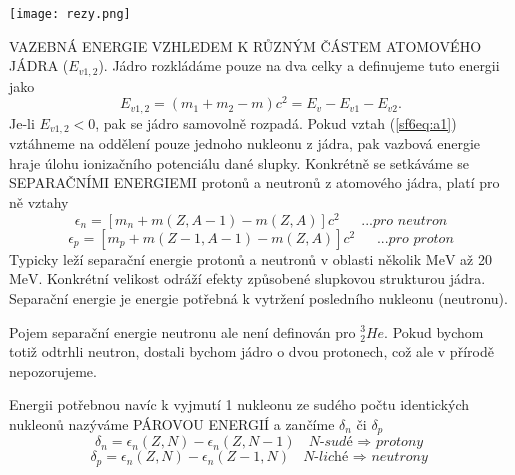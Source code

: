 \documentclass[../../main.tex]{subfiles}
\begin{document}
\begin{center}
	\texttt{[image: rezy.png]}
\end{center}

VAZEBNÁ ENERGIE VZHLEDEM K RŮZNÝM ČÁSTEM ATOMOVÉHO JÁDRA ($E_{v1,2}$). Jádro rozkládáme pouze na dva celky a definujeme tuto energii jako 
\begin{equation}\label{sf6eq:a1}
E_{v1,2} = (m_1 + m_2 - m)c^2 = E_v - E_{v1} - E_{v2}.
\end{equation} 
Je-li $E_{v1,2} < 0$, pak se jádro samovolně rozpadá. Pokud vztah (\ref{sf6eq:a1}) vztáhneme na oddělení pouze jednoho nukleonu z jádra, pak vazbová energie hraje úlohu ionizačního potenciálu dané slupky. Konkrétně se setkáváme se SEPARAČNÍMI ENERGIEMI protonů a neutronů z atomového jádra, platí pro ně vztahy 
\begin{equation}
\epsilon _n = \left[ m_n + m(Z, A-1) - m(Z,A)\right] c^2   ~~~~~~~  \textit{...pro neutron}
\end{equation}
\begin{equation}
\epsilon _p = \left[ m_p + m(Z-1, A-1) - m(Z,A)\right] c^2  ~~~~~~~   \textit{...pro proton}
\end{equation}
Typicky leží separační energie protonů a neutronů v oblasti několik $\mathrm{MeV}$ až 20 $\mathrm{MeV}$. Konkrétní velikost odráží efekty způsobené slupkovou strukturou jádra. Separační energie je energie potřebná k vytržení posledního nukleonu (neutronu). 

Pojem separační energie neutronu ale není definován pro $^{3}_{2}He$. Pokud bychom totiž odtrhli neutron, dostali bychom jádro o dvou protonech, což ale v přírodě nepozorujeme. 

Energii potřebnou navíc k vyjmutí 1 nukleonu ze sudého počtu identických nukleonů nazýváme PÁROVOU ENERGIÍ a zančíme $\delta _n$ či $\delta _p$
\begin{equation}
\delta _n = \epsilon _n (Z,N) - \epsilon _n (Z,N-1) ~~~ \textit{N-sudé $\Rightarrow$ protony}
\end{equation}
\begin{equation}
\delta _p = \epsilon _n (Z,N) - \epsilon _n (Z-1,N) ~~~ \textit{N-liché $\Rightarrow$ neutrony}
\end{equation}
\end{document}
